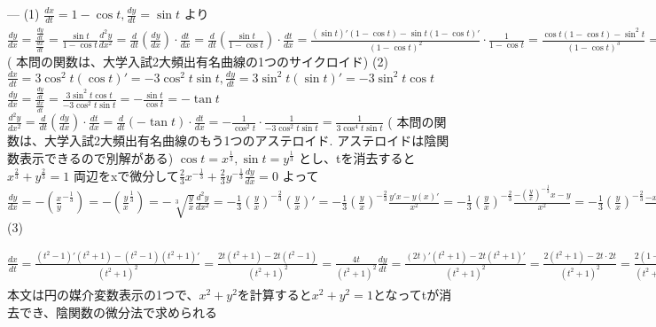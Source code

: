 ---
(1) 
$
\frac{dx}{dt}=1-\cos{t}, \frac{dy}{dt}=\sin{t}
$ より $
\frac{dy}{dx}=\frac{\frac{dy}{dt}}{\frac{dx}{dt}} = \frac{\sin t}{1-\cos t}
\frac{d^2y}{dx^2}= \frac{d}{dt}(\frac{dy}{dx})\cdot\frac{dt}{dx}=\frac{d}{dt}(\frac{\sin t}{1-\cos t})\cdot\frac{dt}{dx}
=\frac{(\sin t)'(1-\cos t)-\sin t(1-\cos t)'}{(1-\cos t)^2} \cdot \frac{1}{1-\cos t}
=\frac{\cos t(1-\cos t)-\sin^2 t}{(1-\cos t)^3}
=\frac{\cos t-(\cos^2 t + \sin^2 t)}{(1-\cos t)^3}
= \frac{\cos t -1}{(1-\cos t)^3}=-\frac{1-\cos t}{(1-\cos t)^3}
=-\frac{1}{(1-\cos t)^2}
$
( 本問の関数は、大学入試2大頻出有名曲線の1つのサイクロイド)
(2)
$
\frac{dx}{dt}=3\cos^2 t(\cos t)'=-3\cos^2 t \sin t, 
\frac{dy}{dt}=3\sin^2 t(\sin t)'=-3\sin^2 t \cos t
$
$
\frac{dy}{dx}=\frac{\frac{dy}{dt}}{\frac{dx}{dt}}=\frac{3\sin^2 t \cos t}{-3\cos^2 t \sin t}=-\frac{\sin t}{\cos t}=-\tan t
$
$
\frac{d^2y}{dx^2}=\frac{d}{dt}(\frac{dy}{dx})\cdot\frac{dt}{dx}=\frac{d}{dt}(-\tan t)\cdot\frac{dt}{dx}
= -\frac{1}{\cos^2 t}\cdot\frac{1}{-3\cos^2 t\sin t}=\frac{1}{3\cos^4 t\sin t}
$
( 本問の関数は、大学入試2大頻出有名曲線のもう1つのアステロイド. アステロイドは陰関数表示できるので別解がある)
$
\cos t = x^{\frac{1}{3}}, \sin t = y^{\frac{1}{3}}
$
とし、tを消去すると $
x^{\frac{2}{3}}+y^{\frac{2}{3}}=1
$
両辺をxで微分して$
\frac{2}{3}x^{-\frac{1}{3}}+\frac{2}{3}y^{-\frac{1}{3}}\frac{dy}{dx}=0
$ よって $
\frac{dy}{dx}=-(\frac{x}{y}^{-\frac{1}{3}})=-(\frac{y}{x}^{\frac{1}{3}})=-\sqrt[3]{\frac{y}{x}}
\frac{d^2y}{dx^2}=-\frac{1}{3}(\frac{y}{x})^{-\frac{2}{3}}(\frac{y}{x})'=-\frac{1}{3}(\frac{y}{x})^{-\frac{2}{3}}\frac{y'x-y(x)'}{x^2}
=-\frac{1}{3}(\frac{y}{x})^{-\frac{2}{3}}\frac{-(\frac{y}{x})^{-\frac{1}{3}}x-y}{x^2}
=-\frac{1}{3}(\frac{y}{x})^{-\frac{2}{3}}\frac{-x^{\frac{2}{3}}y^{\frac{1}{3}}-y}{x^2}
=-\frac{y^{-\frac{2}{3}}\cdot y^{\frac{1}{3}}(x^{\frac{2}{3}}+y^{\frac{2}{3}})}{3\cdot x^{-\frac{2}{3}}\cdot x^2}
=-\frac{y^{-\frac{2}{3}}\cdot y^{\frac{1}{3}}(x^{\frac{2}{3}}+y^{\frac{2}{3}})}{3\cdot x^{-\frac{2}{3}}\cdot x^2}
=-\frac{y^{-\frac{1}{3}}(x^{\frac{2}{3}}+y^{\frac{2}{3}})}{3 x^{\frac{4}{3}}}
=-\frac{x^{\frac{2}{3}}+y^{\frac{2}{3}}}{3 x^{\frac{4}{3}}y^{\frac{1}{3}}}=\frac{1}{3x\sqrt[3]{xy}}
$
(3)
$
\frac{dx}{dt}
=\frac{(t^2-1)'(t^2+1)-(t^2-1)(t^2+1)'}{(t^2+1)^2}
=\frac{2t(t^2+1)-2t(t^2-1)}{(t^2+1)^2}
=\frac{4t}{(t^2+1)^2}
\frac{dy}{dt}
=\frac{(2t)'(t^2+1)-2t(t^2+1)'}{(t^2+1)^2}
=\frac{2(t^2+1)-2t\cdot 2t}{(t^2+1)^2}
=\frac{2(1-t^2)}{(t^2+1)^2}
\frac{dy}{dx} = \frac{\frac{dy}{dt}}{\frac{dx}{dt}}
=\frac{\frac{2(1-t^2)}{(t^2+1)^2}}{\frac{4t}{(t^2+1)^2}}
=\frac{1-t^2}{2t}
\frac{d^2y}{dx^2} = \frac{d}{dt}(\frac{dy}{dx})\cdot\frac{dt}{dx}
= \frac{d}{dt}(\frac{1-t^2}{2t})\cdot\frac{dt}{dx}
= \frac{(1-t^2)'2t-(1-t^2)(2t)')}{4t^2}\cdot\frac{(t^2+1)^2}{4t}=-\frac{(t^2+1)^3}{8t^3}
$
本文は円の媒介変数表示の1つで、$
x^2+y^2
$を計算すると$
x^2+y^2=1
$となってtが消去でき、陰関数の微分法で求められる

